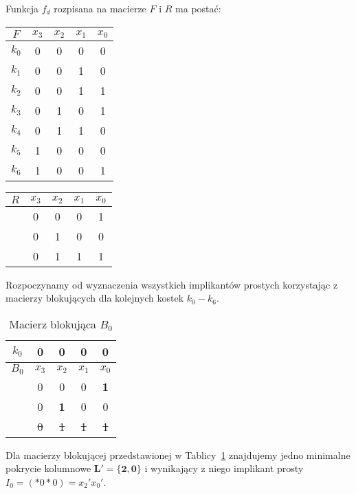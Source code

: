 Funkcja $f_d$ rozpisana na macierze $F$ i $R$ ma postać:
\begin{center}
    \begin{tabular}[t]{ |c|c c c c| }
        \hline
        $F$ & $x_3$ & $x_2$ & $x_1$ & $x_0$ \\
        \hline
        $k_0$ & 0 & 0 & 0 & 0 \\
        $k_1$ & 0 & 0 & 1 & 0 \\
        $k_2$ & 0 & 0 & 1 & 1 \\
        $k_3$ & 0 & 1 & 0 & 1 \\
        $k_4$ & 0 & 1 & 1 & 0 \\
        $k_5$ & 1 & 0 & 0 & 0 \\
        $k_6$ & 1 & 0 & 0 & 1 \\
        \hline
    \end{tabular}
    \hspace{1cm}
    \begin{tabular}[t]{ |c|c c c c| }
        \hline
        $R$ & $x_3$ & $x_2$ & $x_1$ & $x_0$ \\
        \hline
        & 0 & 0 & 0 & 1 \\
        & 0 & 1 & 0 & 0 \\
        & 0 & 1 & 1 & 1 \\
        \hline
    \end{tabular}
\end{center}

Rozpoczynamy od wyznaczenia wszystkich implikantów prostych korzystając z macierzy blokujących dla kolejnych kostek
$k_0-k_6$.
\begin{table}[H]
    \centering
    \begin{tabular}[t]{ |c|c c c c| }
        \hline
        $k_0$ & 0 & 0 & 0 & 0 \\
        \hline\hline
        $B_0$ & $x_3$ & $x_2$ & $x_1$ & $x_0$ \\
        \hline
        & 0 & 0 & 0 & \textbf{1} \\
        & 0 & \textbf{1} & 0 & 0 \\
        & \sout{0} & \sout{1} & \sout{1} & \sout{1} \\
        \hline
    \end{tabular}
    \caption{Macierz blokująca $B_0$} \label{tab:b0}
\end{table}
Dla macierzy blokującej przedstawionej w Tablicy~\ref{tab:b0} znajdujemy jedno minimalne pokrycie kolumnowe
$\bm{L'=\{2,0\}}$ i wynikający z niego implikant prosty $I_0=(*0*0)=x_2'x_0'$.


